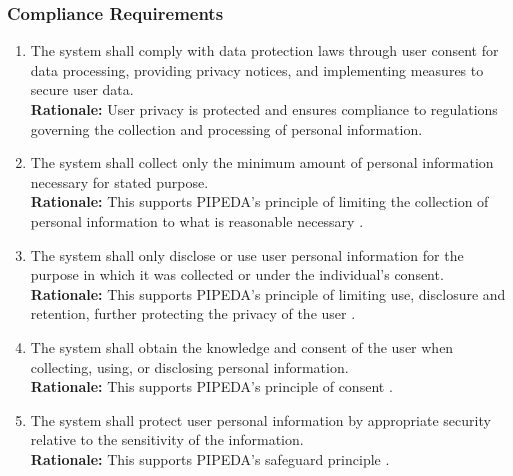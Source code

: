 \documentclass[]{article}
\begin{document}
\subsubsection{Compliance Requirements}
\label{ssub:compliance_requirements}
\begin{enumerate}[{LR-COMP}1. ]
	\item The system shall comply with data protection laws through user consent for data processing,
	      providing privacy notices, and implementing measures to secure user data. \\
	      {\bf Rationale:} User privacy is protected and ensures compliance to regulations governing the collection and processing
	      of personal information.
	\item The system shall collect only the minimum amount of personal information necessary for stated purpose. \\
	      {\bf Rationale:} This supports PIPEDA's principle of limiting the collection of personal information to what is
	      reasonable necessary \cite{10c}.
	\item The system shall only disclose or use user personal information for the purpose in which it was collected or
	      under the individual's consent.\\
	      {\bf Rationale:} This supports PIPEDA's principle of limiting use, disclosure and retention, further protecting the
	      privacy of the user \cite{10c}.
	\item The system shall obtain the knowledge and consent of the user when collecting, using,
	      or disclosing personal information. \\
	      {\bf Rationale:} This supports PIPEDA's principle of consent \cite{10c}.
	\item The system shall protect user personal information by appropriate security relative to the
	      sensitivity of the information. \\
	      {\bf Rationale:} This supports PIPEDA's safeguard principle \cite{10c}.
\end{enumerate}
\end{document}
